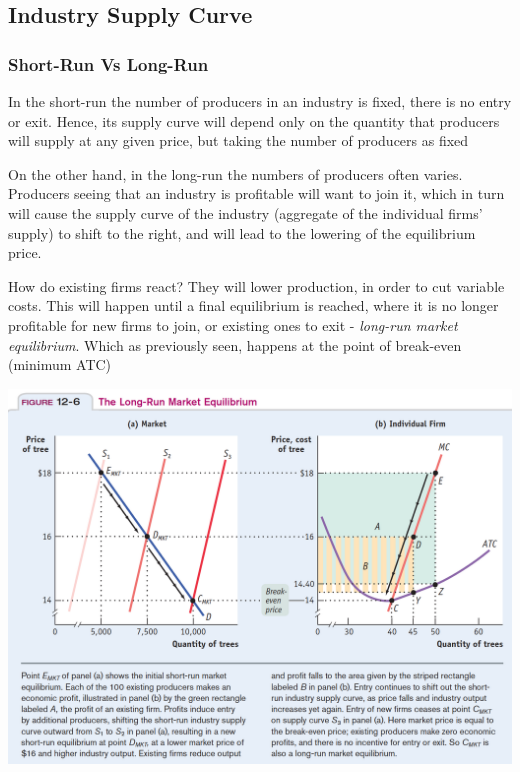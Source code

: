 \documentclass[english,course]{Notes}
\newcommand{\ita}[1]{\textit{#1}}
\begin{document}
{\newpage

\subsection{Industry Supply Curve}


\subsubsection{Short-Run Vs Long-Run}

\par{In the short-run the number of producers in an industry is fixed, there is no entry or exit. Hence, its supply curve will depend only on the quantity that producers will supply at any given price, but taking the number of producers as fixed}

\par{On the other hand, in the long-run the numbers of producers often varies. Producers seeing that an industry is profitable will want to join it, which in turn will cause the supply curve of the industry (aggregate of the individual firms' supply) to shift to the right, and will lead to the lowering of the equilibrium price.}
\par{How do existing firms react? They will lower production, in order to cut variable costs. This will happen until a final equilibrium is reached, where it is no longer profitable for new firms to join, or existing ones to exit - \ita{long-run market equilibrium}. Which as previously seen, happens at the point of break-even (minimum ATC)} }


\includegraphics[width=\textwidth]{longRunEntry}
\end{document}
